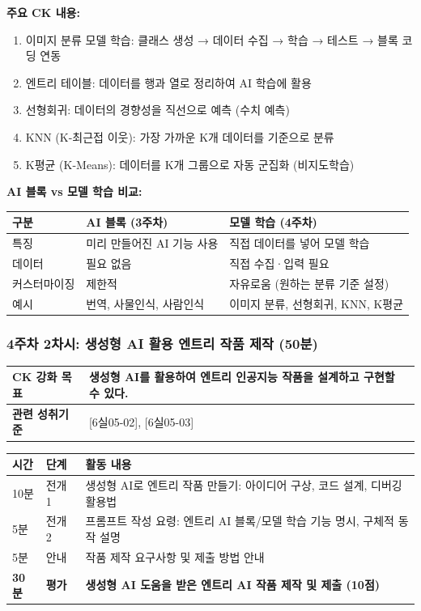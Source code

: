 \documentclass[a4paper,11pt]{article}
\begin{document}
\textbf{주요 CK 내용:}
\begin{enumerate}[nosep,start=26]
\item 이미지 분류 모델 학습: 클래스 생성 → 데이터 수집 → 학습 → 테스트 → 블록 코딩 연동
\item 엔트리 테이블: 데이터를 행과 열로 정리하여 AI 학습에 활용
\item 선형회귀: 데이터의 경향성을 직선으로 예측 (수치 예측)
\item KNN (K-최근접 이웃): 가장 가까운 K개 데이터를 기준으로 분류
\item K평균 (K-Means): 데이터를 K개 그룹으로 자동 군집화 (비지도학습)
\end{enumerate}

\textbf{AI 블록 vs 모델 학습 비교:}

\noindent
\begin{tabularx}{\textwidth}{|p{2.3cm}|X|X|}
\hline
\textbf{구분} & \textbf{AI 블록 (3주차)} & \textbf{모델 학습 (4주차)} \\ \hline
특징 & 미리 만들어진 AI 기능 사용 & 직접 데이터를 넣어 모델 학습 \\ \hline
데이터 & 필요 없음 & 직접 수집·입력 필요 \\ \hline
커스터마이징 & 제한적 & 자유로움 (원하는 분류 기준 설정) \\ \hline
예시 & 번역, 사물인식, 사람인식 & 이미지 분류, 선형회귀, KNN, K평균 \\ \hline
\end{tabularx}

\subsubsection{4주차 2차시: 생성형 AI 활용 엔트리 작품 제작 (50분)}

\noindent
\begin{tabularx}{\textwidth}{|>{\bfseries\arraybackslash}p{2.5cm}|X|}
\hline
CK 강화 목표 & 생성형 AI를 활용하여 엔트리 인공지능 작품을 설계하고 구현할 수 있다. \\ \hline
관련 성취기준 & {[6실05-02]}, {[6실05-03]} \\ \hline
\end{tabularx}

\vspace{0.3em}\noindent
\begin{tabularx}{\textwidth}{|>{\centering\arraybackslash}p{1cm}|>{\centering\arraybackslash}p{1.5cm}|X|}
\hline
\textbf{시간} & \textbf{단계} & \textbf{활동 내용} \\ \hline
10분 & 전개 1 & 생성형 AI로 엔트리 작품 만들기: 아이디어 구상, 코드 설계, 디버깅 활용법 \\ \hline
5분 & 전개 2 & 프롬프트 작성 요령: 엔트리 AI 블록/모델 학습 기능 명시, 구체적 동작 설명 \\ \hline
5분 & 안내 & 작품 제작 요구사항 및 제출 방법 안내 \\ \hline
\textbf{30분} & \textbf{평가} & \textbf{생성형 AI 도움을 받은 엔트리 AI 작품 제작 및 제출 (10점)} \\ \hline
\end{tabularx}
\end{document}
